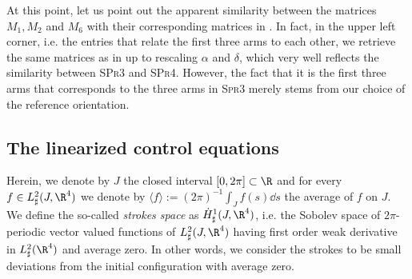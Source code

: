 \begin{remark}
At this point, let us point out the apparent similarity between the matrices $M_1, M_2$ and $M_6$ with their corresponding matrices in \cite{Alouges2017}. In fact, in the upper left corner, i.e. the entries that relate the first three arms to each other, we retrieve the same matrices as in \cite{Alouges2017} up to rescaling $\alpha$ and $\delta$, which very well reflects the similarity between \textsc{SPr3} and \textsc{SPr4}. However, the fact that it is the first three arms that corresponds to the three arms in \textsc{Spr3} merely stems from our choice of the reference orientation.
\end{remark}

\subsection{The linearized control equations}
Herein, we denote by $J$ the closed interval  $[0,2\pi] \subset \R$ and for every $f \in L^{2}_{\sharp}(J, \R^4)$ we denote by $\langle f \rangle := (2\pi)^{-1} \int_{J} f(s) \dd s$ the average of $f$ on $J$.
We define the so-called \emph{strokes space} as $\dot{H}_\sharp^1(J, \R^4)$, i.e. the Sobolev space of $2\pi$-periodic vector valued functions of $L_{\sharp}^2(J, \R^4)$ having first order weak derivative in $L_{\sharp}^2(\R^4)$ and average zero. In other words, we consider the strokes to be small deviations from the initial configuration with average zero.

